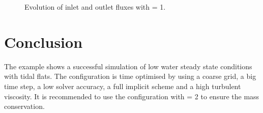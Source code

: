 \begin{figure} [h!]
\centering
{}
\caption{Evolution of inlet and outlet fluxes with  = 1.}
\label{t2d:wesel:fluxes}
\end{figure}

\section{Conclusion}
The example shows a successful simulation of low water steady state conditions
with tidal flats.
The configuration is time optimised by using a coarse grid, a big time step,
a low solver accuracy, a full implicit scheme and a high turbulent viscosity.
It is recommended to use the configuration with
 = 2 to ensure the mass conservation. 





